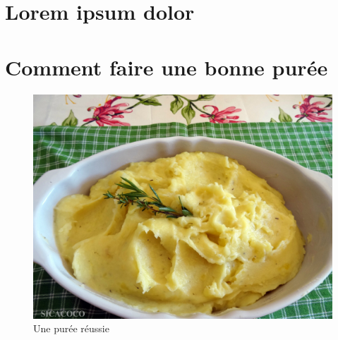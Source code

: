 \documentclass[10pt,a4paper]{article}
\begin{document}
\section{Lorem ipsum dolor}

\lipsum[1-13]

\section{Comment faire une bonne purée}
\begin{figure}[h]
\begin{center}
\includegraphics[width = .8\textwidth]{96234589_o}
\end{center}
\caption{Une purée réussie}
\label{fig:puree}
\end{figure}
\end{document}
